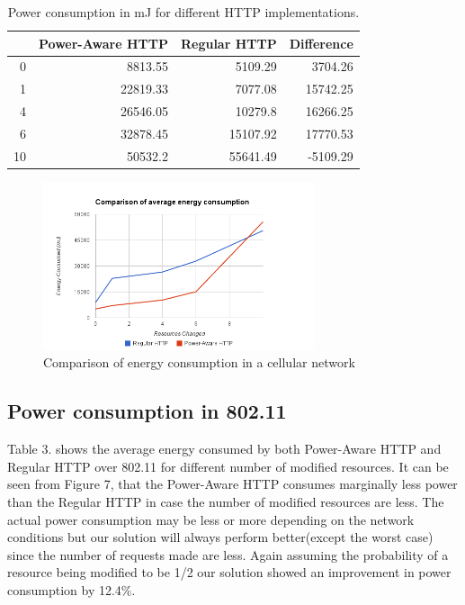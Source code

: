 \documentclass{sigplanconf}
\begin{document}
\begin{table}[htbp]
\centering
\caption{Power consumption in mJ for different HTTP implementations.}
\begin{tabular}{|r|r|r|r|}
\hline
\multicolumn{1}{|l|}{} & \multicolumn{1}{l|}{Power-Aware HTTP} & \multicolumn{1}{l|}{Regular HTTP} & \multicolumn{1}{l|}{Difference} \\ \hline
0 & 8813.55 & 5109.29 & 3704.26 \\ \hline
1 & 22819.33 & 7077.08 & 15742.25 \\ \hline
4 & 26546.05 & 10279.8 & 16266.25 \\ \hline
6 & 32878.45 & 15107.92 & 17770.53 \\ \hline
10 & 50532.2 & 55641.49 & -5109.29 \\ \hline
\end{tabular}
\label{}
\end{table}



\begin{figure}[ht!]
\centering
\includegraphics[width=80mm]{avg_energy_cell.png}
\caption{Comparison of energy consumption in a cellular network}
\label{fig:sp_gd_mnist}
\end{figure}

\subsection{Power consumption in 802.11}
Table 3. shows the average energy consumed by both Power-Aware HTTP and Regular HTTP over 802.11 for different number of modified resources. It can be seen from Figure 7, that the Power-Aware HTTP consumes marginally less power than the Regular HTTP in case the number of modified resources are less. The actual power consumption may be less or more depending on the network conditions but our solution will always perform better(except the worst case) since the number of requests made are less. Again assuming the probability of a resource being modified to be 1/2 our solution showed an improvement in power consumption by 12.4\%.
\end{document}
